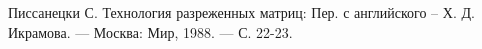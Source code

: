 \begin{thebibliography}{}
	 Писсанецки С. Технология разреженных матриц: Пер. с английского -- Х. Д. Икрамова. --- Москва: Мир, 1988. --- С. 22-23.
\end{thebibliography}
